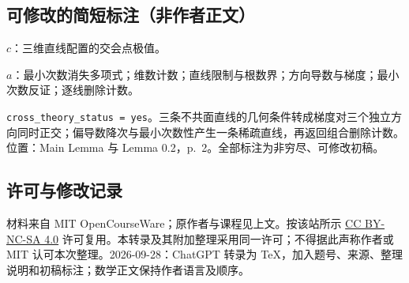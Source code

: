 \documentclass[UTF8,11pt]{ctexart}
\begin{document}
\subsection*{可修改的简短标注（非作者正文）}
$c$：三维直线配置的交会点极值。

$a$：最小次数消失多项式；维数计数；直线限制与根数界；方向导数与梯度；最小次数反证；逐线删除计数。

\texttt{cross\_theory\_status = yes}。三条不共面直线的几何条件转成梯度对三个独立方向同时正交；偏导数降次与最小次数性产生一条稀疏直线，再返回组合删除计数。位置：Main Lemma 与 Lemma 0.2，p.~2。全部标注为非穷尽、可修改初稿。
\subsection*{许可与修改记录}
材料来自 MIT OpenCourseWare；原作者与课程见上文。按该站所示 \href{https://creativecommons.org/licenses/by-nc-sa/4.0/}{CC BY-NC-SA 4.0} 许可复用。本转录及其附加整理采用同一许可；不得据此声称作者或 MIT 认可本次整理。2026-09-28：ChatGPT 转录为 TeX，加入题号、来源、整理说明和初稿标注；数学正文保持作者语言及顺序。
\end{document}
